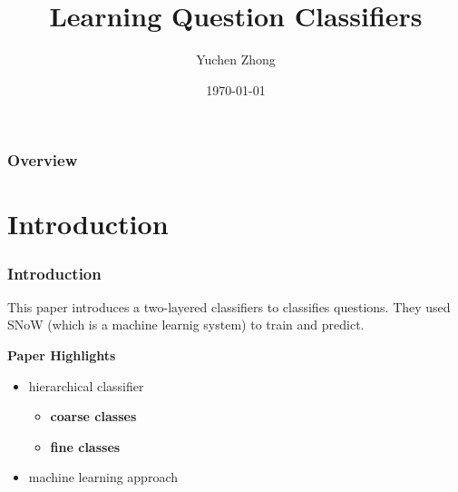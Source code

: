 \documentclass{beamer}
\title[Question Classification]{Learning Question Classifiers} %
\author{Yuchen Zhong} %
\institute[Tongji University] %
    {
        Tongji University \\ %
    \medskip
    \textit{} %
    }
\date{\today} %
\begin{document}
    
    \begin{frame}
    \titlepage %
    \end{frame}
    
    \begin{frame}
    \frametitle{Overview} %
    \tableofcontents %
    \end{frame}
    
    
    \section{Introduction} %
    
    \begin{frame}
        \frametitle{Introduction}
        \begin{block}{}
        This paper introduces a two-layered classifiers to classifies
        questions. They used SNoW
        (which is a machine learnig system) to train and predict.
        \end{block}
        
        
        \textbf{Paper Highlights}
        \begin{itemize}
            \item hierarchical classifier
            \begin{itemize}
                \item \textbf{coarse classes}
                \item \textbf{fine classes}
            \end{itemize}
            \item machine learning approach
        \end{itemize}
    \end{frame}
\end{document}
